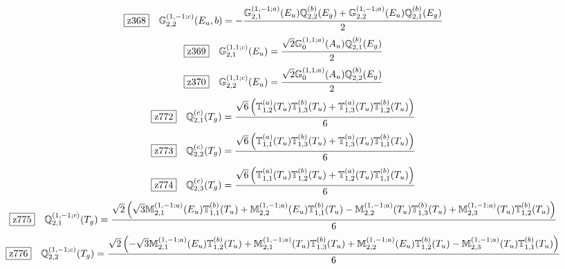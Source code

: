 \documentclass[fleqn,10pt,landscape]{jsarticle}
\begin{document}
\begin{dmath*}
\hspace*{3mm}\fbox{z368}\quad \mathbb{G}_{2,2}^{(1,-1;c)}(E_{u},b)=- \frac{\mathbb{G}_{2,1}^{(1,-1;a)}(E_{u}) \mathbb{Q}_{2,2}^{(b)}(E_{g}) + \mathbb{G}_{2,2}^{(1,-1;a)}(E_{u}) \mathbb{Q}_{2,1}^{(b)}(E_{g})}{2}
\end{dmath*}
\begin{dmath*}
\hspace*{3mm}\fbox{z369}\quad \mathbb{G}_{2,1}^{(1,1;c)}(E_{u})=\frac{\sqrt{2} \mathbb{G}_{0}^{(1,1;a)}(A_{u}) \mathbb{Q}_{2,1}^{(b)}(E_{g})}{2}
\end{dmath*}
\begin{dmath*}
\hspace*{3mm}\fbox{z370}\quad \mathbb{G}_{2,2}^{(1,1;c)}(E_{u})=\frac{\sqrt{2} \mathbb{G}_{0}^{(1,1;a)}(A_{u}) \mathbb{Q}_{2,2}^{(b)}(E_{g})}{2}
\end{dmath*}
\begin{dmath*}
\hspace*{3mm}\fbox{z772}\quad \mathbb{Q}_{2,1}^{(c)}(T_{g})=\frac{\sqrt{6} \left(\mathbb{T}_{1,2}^{(a)}(T_{u}) \mathbb{T}_{1,3}^{(b)}(T_{u}) + \mathbb{T}_{1,3}^{(a)}(T_{u}) \mathbb{T}_{1,2}^{(b)}(T_{u})\right)}{6}
\end{dmath*}
\begin{dmath*}
\hspace*{3mm}\fbox{z773}\quad \mathbb{Q}_{2,2}^{(c)}(T_{g})=\frac{\sqrt{6} \left(\mathbb{T}_{1,1}^{(a)}(T_{u}) \mathbb{T}_{1,3}^{(b)}(T_{u}) + \mathbb{T}_{1,3}^{(a)}(T_{u}) \mathbb{T}_{1,1}^{(b)}(T_{u})\right)}{6}
\end{dmath*}
\begin{dmath*}
\hspace*{3mm}\fbox{z774}\quad \mathbb{Q}_{2,3}^{(c)}(T_{g})=\frac{\sqrt{6} \left(\mathbb{T}_{1,1}^{(a)}(T_{u}) \mathbb{T}_{1,2}^{(b)}(T_{u}) + \mathbb{T}_{1,2}^{(a)}(T_{u}) \mathbb{T}_{1,1}^{(b)}(T_{u})\right)}{6}
\end{dmath*}
\begin{dmath*}
\hspace*{3mm}\fbox{z775}\quad \mathbb{Q}_{2,1}^{(1,-1;c)}(T_{g})=\frac{\sqrt{2} \left(\sqrt{3} \mathbb{M}_{2,1}^{(1,-1;a)}(E_{u}) \mathbb{T}_{1,1}^{(b)}(T_{u}) + \mathbb{M}_{2,2}^{(1,-1;a)}(E_{u}) \mathbb{T}_{1,1}^{(b)}(T_{u}) - \mathbb{M}_{2,2}^{(1,-1;a)}(T_{u}) \mathbb{T}_{1,3}^{(b)}(T_{u}) + \mathbb{M}_{2,3}^{(1,-1;a)}(T_{u}) \mathbb{T}_{1,2}^{(b)}(T_{u})\right)}{6}
\end{dmath*}
\begin{dmath*}
\hspace*{3mm}\fbox{z776}\quad \mathbb{Q}_{2,2}^{(1,-1;c)}(T_{g})=\frac{\sqrt{2} \left(- \sqrt{3} \mathbb{M}_{2,1}^{(1,-1;a)}(E_{u}) \mathbb{T}_{1,2}^{(b)}(T_{u}) + \mathbb{M}_{2,1}^{(1,-1;a)}(T_{u}) \mathbb{T}_{1,3}^{(b)}(T_{u}) + \mathbb{M}_{2,2}^{(1,-1;a)}(E_{u}) \mathbb{T}_{1,2}^{(b)}(T_{u}) - \mathbb{M}_{2,3}^{(1,-1;a)}(T_{u}) \mathbb{T}_{1,1}^{(b)}(T_{u})\right)}{6}
\end{dmath*}
\end{document}
